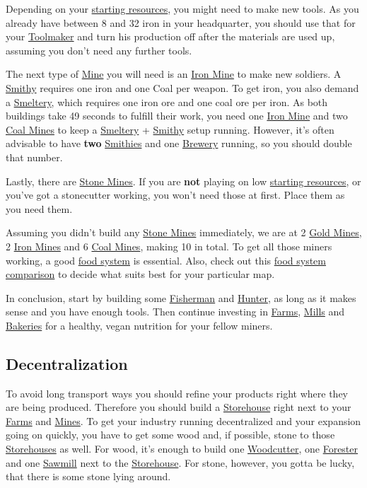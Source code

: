 \documentclass[12pt]{article}
\begin{document}
Depending on your \hyperref[sec:startresources]{starting resources}, you might need to make new tools. As you already have between 8 and 32 iron in your headquarter, you should use that for your \hyperref[sec:toolmaker]{Toolmaker} and turn his production off after the materials are used up, assuming you don't need any further tools.

The next type of \hyperref[sec:mine]{Mine} you will need is an \hyperref[sec:ironmine]{Iron Mine} to make new soldiers. A \hyperref[sec:smithy]{Smithy} requires one iron and one Coal per weapon. To get iron, you also demand a \hyperref[sec:smeltery]{Smeltery}, which requires one iron ore and one coal ore per iron. As both buildings take 49 seconds to fulfill their work, you need one \hyperref[sec:ironmine]{Iron Mine} and two \hyperref[sec:coalmine]{Coal Mines} to keep a \hyperref[sec:smeltery]{Smeltery} + \hyperref[sec:smithy]{Smithy} setup running. However, it's often advisable to have \textbf{two} \hyperref[sec:smithy]{Smithies} and one \hyperref[sec:brewery]{Brewery} running, so you should double that number.

Lastly, there are \hyperref[sec:stonemine]{Stone Mines}. If you are \textbf{not} playing on low \hyperref[sec:startresources]{starting resources}, or you've got a stonecutter working, you won't need those at first. Place them as you need them.

Assuming you didn't build any \hyperref[sec:stonemine]{Stone Mines} immediately, we are at 2 \hyperref[sec:goldmine]{Gold Mines}, 2 \hyperref[sec:ironmine]{Iron Mines} and 6 \hyperref[sec:coalmine]{Coal Mines}, making 10 in total. To get all those miners working, a good \hyperref[sec:foodsystems]{food system} is essential. Also, check out this \hyperref[sec:foodsystemcomparison]{food system comparison} to decide what suits best for your particular map.

In conclusion, start by building some \hyperref[sec:fisherman]{Fisherman} and \hyperref[sec:hunter]{Hunter}, as long as it makes sense and you have enough tools.
Then continue investing in \hyperref[sec:farm]{Farms}, \hyperref[sec:mill]{Mills} and \hyperref[sec:bakery]{Bakeries} for a healthy, vegan nutrition for your fellow miners.

\subsection{Decentralization}
\label{sec:decentralization}

To avoid long transport ways you should refine your products right where they are being produced. Therefore you should build a \hyperref[sec:storehouse]{Storehouse} right next to your \hyperref[sec:farm]{Farms} and \hyperref[sec:mine]{Mines}. To get your industry running decentralized and your expansion going on quickly, you have to get some wood and, if possible, stone to those \hyperref[sec:storehouse]{Storehouses} as well. For wood, it's enough to build one \hyperref[sec:woodcutter]{Woodcutter}, one \hyperref[sec:forester]{Forester} and one \hyperref[sec:sawmill]{Sawmill} next to the \hyperref[sec:storehouse]{Storehouse}. For stone, however, you gotta be lucky, that there is some stone lying around.
\end{document}
